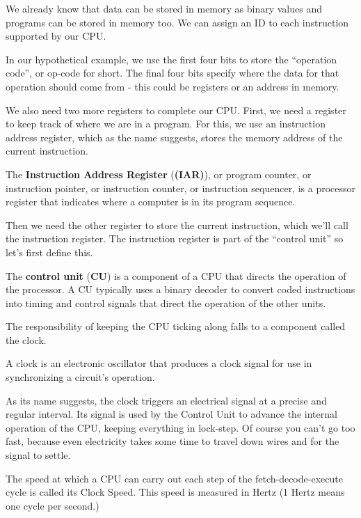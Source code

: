 \ee

We already know that data can be stored in memory as binary values and programs can be stored in memory too. We can
assign an ID to each instruction supported by our CPU.

\be
In our hypothetical example, we use the first four bits to store the ``operation code'', or op-code for short. The
final four bits specify where the data for that operation should come from - this could be registers or an address in
memory.

\ee

We also need two more registers to complete our CPU. First, we need a register to keep track of where we are in a
program. For this, we use an instruction address register, which as the name suggests, stores the memory address of
the current instruction.

The \textbf{Instruction Address Register} (\textbf{(IAR)}), or program counter, or instruction pointer, or
instruction counter, or instruction sequencer, is a processor register that indicates where a computer is in its
program sequence.
\ed

Then we need the other register to store the current instruction, which we'll call the instruction register. The
instruction register is part of the ``control unit'' so let's first define this.

The \textbf{control unit} (\textbf{CU}) is a component of a CPU that directs the operation of the processor. A CU
typically uses a binary decoder to convert coded instructions into timing and control signals that direct the
operation of the other units.
\ed

The responsibility of keeping the CPU ticking along falls to a component called the clock.

\bd[Clock]
A clock is an electronic oscillator that produces a clock signal for use in synchronizing a circuit's operation.
\ed

As its name suggests, the clock triggers an electrical signal at a precise and regular interval. Its signal is used
by the Control Unit to advance the internal operation of the CPU, keeping everything in lock-step. Of course you
can't go too fast, because even electricity takes some time to travel down wires and for the signal to settle.

The speed at which a CPU can carry out each step of the fetch-decode-execute cycle is called its Clock Speed. This
speed is measured in Hertz (1 Hertz means one cycle per second.)
\ed

